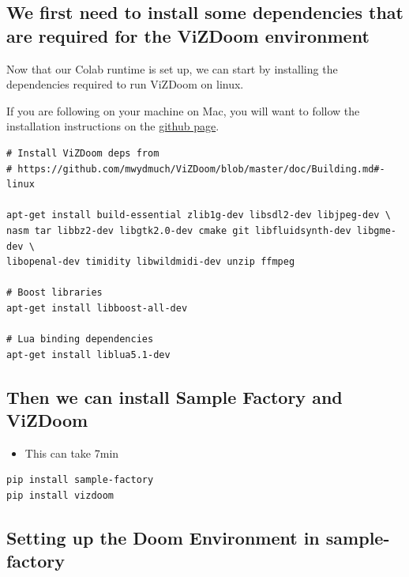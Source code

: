 \documentclass[11pt,a4paper]{article}
\begin{document}
\subsection{We first need to install some dependencies that are required for the ViZDoom environment}\label{we-first-need-to-install-some-dependencies-that-are-required-for-the-vizdoom-environment}

Now that our Colab runtime is set up, we can start by installing the dependencies required to run ViZDoom on linux.

If you are following on your machine on Mac, you will want to follow the installation instructions on the \href{https://github.com/Farama-Foundation/ViZDoom/blob/master/doc/Quickstart.md\#-quickstart-for-macos-and-anaconda3-python-36}{github page}.

\begin{lstlisting}
# Install ViZDoom deps from
# https://github.com/mwydmuch/ViZDoom/blob/master/doc/Building.md#-linux

apt-get install build-essential zlib1g-dev libsdl2-dev libjpeg-dev \
nasm tar libbz2-dev libgtk2.0-dev cmake git libfluidsynth-dev libgme-dev \
libopenal-dev timidity libwildmidi-dev unzip ffmpeg

# Boost libraries
apt-get install libboost-all-dev

# Lua binding dependencies
apt-get install liblua5.1-dev
\end{lstlisting}

\subsection{Then we can install Sample Factory and ViZDoom}\label{then-we-can-install-sample-factory-and-vizdoom}

\begin{itemize}
\tightlist
\item
  This can take 7min
\end{itemize}

\begin{lstlisting}
pip install sample-factory
pip install vizdoom
\end{lstlisting}

\subsection{Setting up the Doom Environment in sample-factory}\label{setting-up-the-doom-environment-in-sample-factory}
\end{document}
